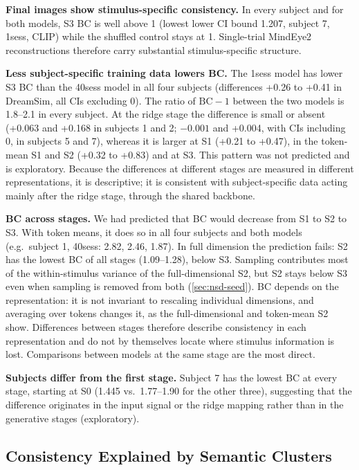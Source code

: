 \documentclass[11pt,a4paper]{article}
\begin{document}
\textbf{Final images show stimulus-specific consistency.} In every subject and for
both models, S3 BC is well above 1 (lowest lower CI bound 1.207, subject 7,
1sess, CLIP) while the shuffled control stays at 1. Single-trial MindEye2
reconstructions therefore carry substantial stimulus-specific structure.

\textbf{Less subject-specific training data lowers BC.} The 1sess model has
lower S3 BC than the 40sess model in all four subjects (differences +0.26 to
+0.41 in DreamSim, all CIs excluding 0). The ratio of $\mathrm{BC}-1$ between the
two models is 1.8--2.1 in every subject. At the ridge stage the difference is
small or absent (+0.063 and +0.168 in subjects 1 and 2; $-0.001$ and +0.004,
with CIs including 0, in subjects 5 and 7), whereas it is larger at S1 (+0.21
to +0.47), in the token-mean S1 and S2 (+0.32 to +0.83) and at S3. This pattern
was not predicted and is exploratory. Because the differences at different
stages are measured in different representations, it is descriptive; it is
consistent with subject-specific data acting mainly after the ridge stage,
through the shared backbone.

\textbf{BC across stages.} We had predicted that BC would decrease from S1 to S2 to S3. With
token means, it does so in all four subjects and both models (e.g.\ subject 1,
40sess: 2.82, 2.46, 1.87). In full dimension the prediction fails: S2 has the
lowest BC of all stages (1.09--1.28), below S3. Sampling contributes most of the
within-stimulus variance of the full-dimensional S2, but S2 stays below S3 even
when sampling is removed from both (\cref{sec:nsd-seed}). BC depends on the
representation: it is not invariant to rescaling individual dimensions, and
averaging over tokens changes it, as the full-dimensional and token-mean S2
show. Differences between stages therefore describe consistency in each
representation and do not by themselves locate where stimulus information is
lost. Comparisons between models at the same stage are the most direct.

\textbf{Subjects differ from the first stage.} Subject 7 has the lowest BC at
every stage, starting at S0 (1.445 vs.\ 1.77--1.90 for the other three),
suggesting that the difference originates in the input signal or the ridge
mapping rather than in the generative stages (exploratory).

\subsection{Consistency Explained by Semantic Clusters}
\label{sec:nsd-category}
\end{document}

